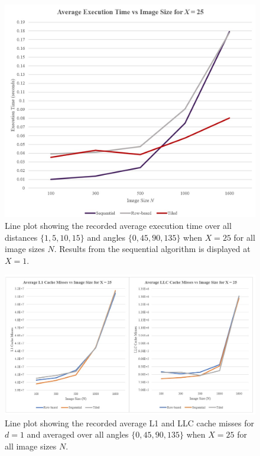 \documentclass{article}
\begin{document}
    \begin{figure}
      \includegraphics[width=\linewidth]{plot25.jpg}
      \caption{Line plot showing the recorded average execution time over all distances $\{1, 5, 10, 15\}$ and angles $\{0, 45, 90, 135\}$ when $X = 25$ for all image sizes $N$.  Results from the sequential algorithm is displayed at $X = 1$. }
      \label{fig:plot25}
    \end{figure}
        \begin{figure}[t]
      \includegraphics[width=\linewidth]{sidebyside.jpg}
      \caption{Line plot showing the recorded average L1 and LLC cache misses for $d = 1$ and averaged over all angles $\{0, 45, 90, 135\}$ when $X = 25$ for all image sizes $N$.  }
      \label{fig:sidebyside}
    \end{figure}
\end{document}

